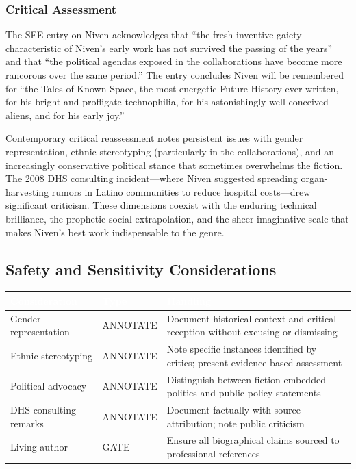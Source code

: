 \documentclass[11pt,letterpaper]{article}
\newcommand{\tableheader}[1]{\textbf{\sffamily\textcolor{white}{#1}}}
\begin{document}
\subsubsection{Critical Assessment}

The SFE entry on Niven acknowledges that ``the fresh inventive gaiety characteristic of Niven's early work has not survived the passing of the years'' and that ``the political agendas exposed in the collaborations have become more rancorous over the same period.'' The entry concludes Niven will be remembered for ``the Tales of Known Space, the most energetic Future History ever written, for his bright and profligate technophilia, for his astonishingly well conceived aliens, and for his early joy.''

Contemporary critical reassessment notes persistent issues with gender representation, ethnic stereotyping (particularly in the collaborations), and an increasingly conservative political stance that sometimes overwhelms the fiction. The 2008 DHS consulting incident---where Niven suggested spreading organ-harvesting rumors in Latino communities to reduce hospital costs---drew significant criticism. These dimensions coexist with the enduring technical brilliance, the prophetic social extrapolation, and the sheer imaginative scale that makes Niven's best work indispensable to the genre.

\subsection{Safety and Sensitivity Considerations}

\begin{center}
\begin{tabularx}{\textwidth}{L{3cm}L{2cm}X}
\toprule
{}
\tableheader{Consideration} & \tableheader{Type} & \tableheader{Handling} \\
\midrule
Gender representation & ANNOTATE & Document historical context and critical reception without excusing or dismissing \\
Ethnic stereotyping & ANNOTATE & Note specific instances identified by critics; present evidence-based assessment \\
Political advocacy & ANNOTATE & Distinguish between fiction-embedded politics and public policy statements \\
DHS consulting remarks & ANNOTATE & Document factually with source attribution; note public criticism \\
Living author & GATE & Ensure all biographical claims sourced to professional references \\
\bottomrule
\end{tabularx}
\end{center}
\end{document}
